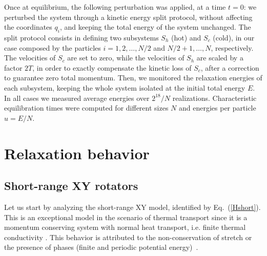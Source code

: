 \documentclass[aps,pre,showpacs,twocolumn,superscriptaddress,floatfix]{revtex4-1}
\begin{document}
Once at equilibrium, the following perturbation was applied, at a time $t=0$: 
%  
we perturbed the system through a kinetic energy split protocol, 
without affecting the coordinates $q_i$, and keeping  the total energy of the system unchanged. 
The split protocol consists in defining two subsystems $S_h$ (hot) and $S_c$ (cold),  
 in our case composed by the particles $i=1,2,\dots, N/2$ and $ N/2+1, \dots, N$, respectively.
% 
The velocities of $S_c$ are set to zero, while the velocities of $S_h$ are scaled by a factor $2T$, 
in order to exactly compensate the kinetic loss of $S_c$, after a correction to guarantee zero 
total momentum. 
%
Then,  we monitored  the relaxation energies of each subsystem, 
keeping the whole system isolated at the initial total energy $E$. 
In all cases we measured average energies over $2^{18}/N$ realizations. 
%
Characteristic equilibration times were computed for   different sizes $N$ and 
 energies per particle  $ u=E/N $.




	
\section{Relaxation behavior}

\subsection{Short-range XY rotators}
\label{sec:short}


Let us start by analyzing the short-range XY model,  identified  by Eq.~(\ref{Hshort}). 
This is an exceptional model in the scenario of thermal transport since it 
is a momentum conserving system with normal 
heat transport, i.e. finite thermal conductivity 
\cite{GiardinaLiviPolitiVassali2000PRL,GendelmanSavin2000PRL,
ReviewLepriLiviPoliti2003,ReviewDhar2008,OlivaresAnteneodo2016PRE}.
%
This behavior is attributed to the non-conservation of
stretch or the presence of phases (finite and periodic potential energy)~\cite{DasDhar2015}. 
\end{document}
